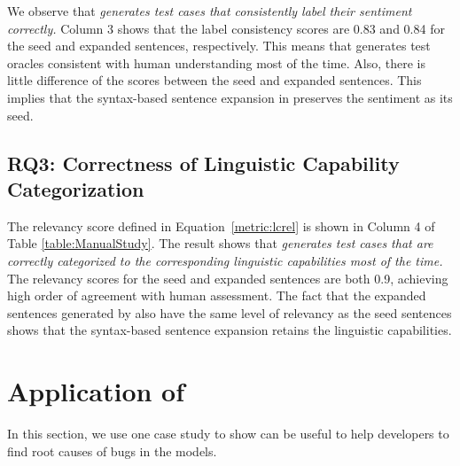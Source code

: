 We observe that \emph{\tool generates test cases that consistently
  label their sentiment correctly.}  Column 3 shows that the label
consistency scores are 0.83 and 0.84 for the seed and expanded
sentences, respectively.
This means that \tool generates test oracles consistent with
human understanding most of the time. Also, there is
little difference of the scores between the seed and expanded
sentences. This implies that the syntax-based sentence expansion in
\tool preserves the sentiment as its seed.


\subsection{RQ3: Correctness of Linguistic Capability Categorization}

The \lc relevancy score defined
in Equation~\ref{metric:lcrel} is shown in Column 4 of Table \ref{table:ManualStudy}. The result shows that
\emph{\tool generates test cases that are correctly categorized to the corresponding linguistic capabilities most of the time.}
The \lc relevancy scores for the seed and expanded sentences are both 0.9, achieving high order of agreement with human assessment. The fact that the expanded sentences
generated by \tool also have the same level of \lc
relevancy as the seed sentences shows that the syntax-based sentence expansion retains the linguistic capabilities.


\section{Application of \tool}

In this section, we use one case study to show  \tool can be useful to help developers to find root causes of bugs in the \sa models.

